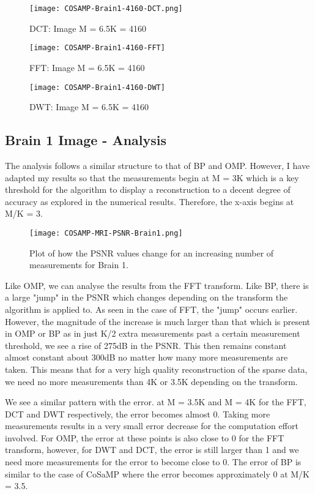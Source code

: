 \documentclass[titlepage,oneside, 12pt]{book}
\theoremstyle{break}
\begin{document}
\begin{figure}[!h]
\centering
{}
  \texttt{[image: COSAMP-Brain1-4160-DCT.png]}
  \caption{DCT: Image M = 6.5K = 4160}\label{fig:COSAMP-Brain1-4160-DCT}
\endminipage
\hspace*{2em}
  \texttt{[image: COSAMP-Brain1-4160-FFT]}
  \caption{FFT: Image M = 6.5K = 4160}\label{fig:COSAMP-Brain1-4160-FFT}
\endminipage
\hspace*{2em}
%
  \texttt{[image: COSAMP-Brain1-4160-DWT]}
  \caption{DWT: Image M = 6.5K = 4160}\label{fig:COSAMP-Brain1-4160-DWT}
\endminipage
\hspace*{2em}
\end{figure}

\clearpage

\subsection{Brain 1 Image - Analysis}

The analysis follows a similar structure to that of BP and OMP. However, I have adapted my results so that the measurements begin at M = 3K which is a key threshold for the algorithm to display a reconstruction to a decent degree of accuracy as explored in the numerical results. Therefore, the x-axis begins at M/K = 3.


\begin{figure}[H]
\centering
\centerline{\texttt{[image: COSAMP-MRI-PSNR-Brain1.png]}}
\caption{Plot of how the PSNR values change for an increasing number of measurements for Brain 1.}
\label{fig:COSAMP-MRI-PSNR-Brain1}
\end{figure}

Like OMP, we can analyse the results from the FFT transform. Like BP, there is a large "jump" in the PSNR which changes depending on the transform the algorithm is applied to. As seen in the case of FFT, the "jump" occurs earlier. However, the magnitude of the increase is much larger than that which is present in OMP or BP as in just K/2 extra measurements past a certain measurement threshold, we see a rise of 275dB in the PSNR. This then remains constant almost constant about 300dB no matter how many more measurements are taken. This means that for a very high quality reconstruction of the sparse data, we need no more measurements than 4K or 3.5K depending on the transform. 

We see a similar pattern with the error. at M = 3.5K and M = 4K for the FFT, DCT and DWT respectively, the error becomes almost 0. Taking more measurements results in a very small error decrease for the computation effort involved. For OMP, the error at these points is also close to 0 for the FFT transform, however, for DWT and DCT, the error is still larger than 1 and we need more measurements for the error to become close to 0. The error of BP is similar to the case of CoSaMP where the error becomes approximately 0 at M/K = 3.5. 
\end{document}
